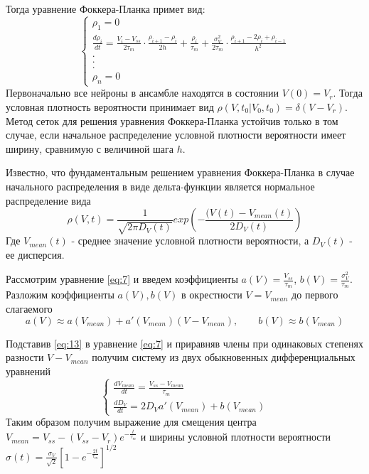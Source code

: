 Тогда уравнение Фоккера-Планка примет вид:
\begin{equation}
\begin{cases}
\rho_1=0 \\
\displaystyle \frac{d\rho_{i}}{dt}=\frac{V_i-V_{ss}}{2\tau_m}\cdot\frac{\rho_{i+1}-\rho_{i}}{2h}+\frac{\rho_{i}}{\tau_m}+\frac{\sigma_V^2}{2\tau_m}\cdot\frac{\rho_{i+1}-2\rho_{i}+\rho_{i-1}}{h^2}\\
.\\
.\\
.\\
\rho_n=0
\end{cases}
\label{eq:11}
\end{equation}
Первоначально все нейроны в ансамбле находятся в состоянии $V(0)=V_r$. Тогда условная плотность вероятности принимает вид $\rho(V, t_0|V_0, t_0)=\delta(V-V_r)$. Метод сеток для решения уравнения Фоккера-Планка устойчив только в том случае, если начальное распределение условной плотности вероятности имеет ширину, сравнимую с величиной шага $h$.

Известно, что фундаментальным решением уравнения Фоккера-Планка в случае начального распределения в виде дельта-функции является нормальное распределение вида
\begin{equation}
	\rho(V,t)=\frac{1}{\sqrt{2\pi D_V(t)}}exp\left(-\frac{(V(t)-V_{mean}(t)}{2D_V(t)}\right)
\label{eq:12}
\end{equation}
Где $V_{mean}(t)$ - среднее значение условной плотности вероятности, а $D_V(t)$ - ее дисперсия.

Рассмотрим уравнение \eqref{eq:7} и введем коэффициенты $a(V)=\frac{V_{ss}}{\tau_m}$, $b(V)=\frac{\sigma_V^2}{\tau_m}$. Разложим коэффициенты $a(V), b(V)$ в окрестности $V=V_{mean}$ до первого слагаемого
\begin{equation}
a(V)\approx a(V_{mean})+a'(V_{mean})(V-V_{mean}), \qquad b(V)\approx b(V_{mean})
\label{eq:13}
\end{equation}

Подставив \eqref{eq:13} в уравнение \eqref{eq:7} и приравняв члены при одинаковых степенях разности $V-V_{mean}$ получим систему из двух обыкновенных дифференциальных уравнений
\begin{equation}
\begin{cases}
\displaystyle \frac{dV_{mean}}{dt}=\frac{V_{ss}-V_{mean}}{\tau_m} \\
\displaystyle \frac{dD_V}{dt}=2D_Va'(V_{mean})+b(V_{mean})
\end{cases}
\label{eq:14}
\end{equation}
Таким образом получим выражение для смещения центра $\displaystyle V_{mean}=V_{ss}-(V_{ss}-V_r)e^{-\frac{t}{\tau_m}}$ и ширины условной плотности вероятности $\displaystyle \sigma(t)=\frac{\sigma_V}{\sqrt{2}}\left[1-e^{-\frac{2t}{\tau_m}}\right]^{1/2}$

